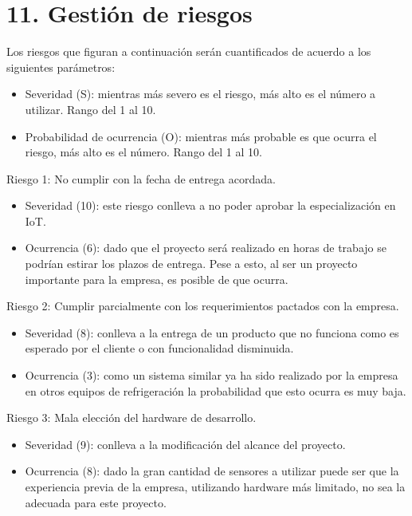 \documentclass[
11pt, %
]{charter}
\begin{document}
\section{11. Gestión de riesgos}
\label{sec:riesgos}

Los riesgos que figuran a continuación serán cuantificados de acuerdo a los siguientes parámetros:
\begin{itemize}
	\item Severidad (S): mientras más severo es el riesgo, más alto es el número a utilizar. Rango del 1 al 10.\\
	\item Probabilidad de ocurrencia (O): mientras más probable es que ocurra el riesgo, más alto es el número. Rango del 1 al 10.\\
\end{itemize}   

Riesgo 1: No cumplir con la fecha de entrega acordada.
\begin{itemize}
	\item Severidad (10): este riesgo conlleva a no poder aprobar la especialización en IoT.\\
	\item Ocurrencia (6): dado que el proyecto será realizado en horas de trabajo se podrían estirar los plazos de entrega. Pese a esto, al ser un proyecto importante para la empresa, es posible de que ocurra. \\
\end{itemize}   

Riesgo 2: Cumplir parcialmente con los requerimientos pactados con la empresa.
\begin{itemize}
	\item Severidad (8): conlleva a la entrega de un producto que no funciona como es esperado por el cliente o con funcionalidad disminuida.
	\item Ocurrencia (3): como un sistema similar ya ha sido realizado por la empresa en otros equipos de refrigeración la probabilidad que esto ocurra es muy baja.
\end{itemize}

Riesgo 3: Mala elección del hardware de desarrollo.
\begin{itemize}
	\item Severidad (9): conlleva a la modificación del alcance del proyecto. 
	\item Ocurrencia (8): dado la gran cantidad de sensores a utilizar puede ser que la experiencia previa de la empresa, utilizando hardware más limitado, no sea la adecuada para este proyecto.
\end{itemize}
\end{document}
